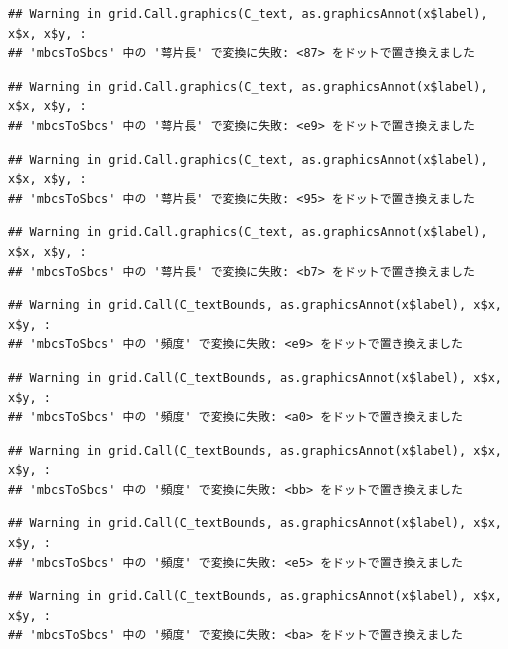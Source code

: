\documentclass[
]{book}
\begin{document}
\begin{verbatim}
## Warning in grid.Call.graphics(C_text, as.graphicsAnnot(x$label), x$x, x$y, :
## 'mbcsToSbcs' 中の '萼片長' で変換に失敗: <87> をドットで置き換えました
\end{verbatim}

\begin{verbatim}
## Warning in grid.Call.graphics(C_text, as.graphicsAnnot(x$label), x$x, x$y, :
## 'mbcsToSbcs' 中の '萼片長' で変換に失敗: <e9> をドットで置き換えました
\end{verbatim}

\begin{verbatim}
## Warning in grid.Call.graphics(C_text, as.graphicsAnnot(x$label), x$x, x$y, :
## 'mbcsToSbcs' 中の '萼片長' で変換に失敗: <95> をドットで置き換えました
\end{verbatim}

\begin{verbatim}
## Warning in grid.Call.graphics(C_text, as.graphicsAnnot(x$label), x$x, x$y, :
## 'mbcsToSbcs' 中の '萼片長' で変換に失敗: <b7> をドットで置き換えました
\end{verbatim}

\begin{verbatim}
## Warning in grid.Call(C_textBounds, as.graphicsAnnot(x$label), x$x, x$y, :
## 'mbcsToSbcs' 中の '頻度' で変換に失敗: <e9> をドットで置き換えました
\end{verbatim}

\begin{verbatim}
## Warning in grid.Call(C_textBounds, as.graphicsAnnot(x$label), x$x, x$y, :
## 'mbcsToSbcs' 中の '頻度' で変換に失敗: <a0> をドットで置き換えました
\end{verbatim}

\begin{verbatim}
## Warning in grid.Call(C_textBounds, as.graphicsAnnot(x$label), x$x, x$y, :
## 'mbcsToSbcs' 中の '頻度' で変換に失敗: <bb> をドットで置き換えました
\end{verbatim}

\begin{verbatim}
## Warning in grid.Call(C_textBounds, as.graphicsAnnot(x$label), x$x, x$y, :
## 'mbcsToSbcs' 中の '頻度' で変換に失敗: <e5> をドットで置き換えました
\end{verbatim}

\begin{verbatim}
## Warning in grid.Call(C_textBounds, as.graphicsAnnot(x$label), x$x, x$y, :
## 'mbcsToSbcs' 中の '頻度' で変換に失敗: <ba> をドットで置き換えました
\end{verbatim}
\end{document}
